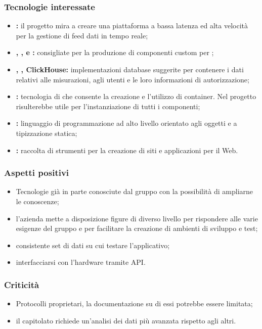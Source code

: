	\subsubsection{Tecnologie interessate}
	\begin{itemize}
		\item \textbf{:} il progetto mira a creare una piattaforma a bassa latenza ed alta velocità per la gestione di feed dati in tempo reale;
		\item \textbf{, ,  e :}  consigliate per la produzione di componenti custom per ;
		\item \textbf{, , ClickHouse:} implementazioni database suggerite per contenere i dati relativi alle misurazioni, agli utenti e le loro informazioni di autorizzazione;
		\item \textbf{:} tecnologia di  che consente la creazione e l'utilizzo di container. Nel progetto risulterebbe utile per l'instanziazione di tutti i componenti;
		\item \textbf{:} linguaggio di programmazione ad alto livello orientato agli oggetti e a tipizzazione statica;
		\item \textbf{:} raccolta di strumenti  per la creazione di siti e applicazioni per il Web.
	\end{itemize}

	\subsubsection{Aspetti positivi}
	\begin{itemize}
		\item Tecnologie già in parte conosciute dal gruppo con la possibilità di ampliarne le conoscenze;
		\item l'azienda mette a disposizione figure di diverso livello per rispondere alle varie esigenze del gruppo e per facilitare la creazione di ambienti di sviluppo e test;
		\item consistente set di dati su cui testare l'applicativo;
		\item interfacciarsi con l'hardware tramite API.
	\end{itemize}

	\subsubsection{Criticità}
	\begin{itemize}
		\item Protocolli proprietari, la documentazione su di essi potrebbe essere limitata;
		\item il capitolato richiede un'analisi dei dati più avanzata rispetto agli altri.
	\end{itemize}

